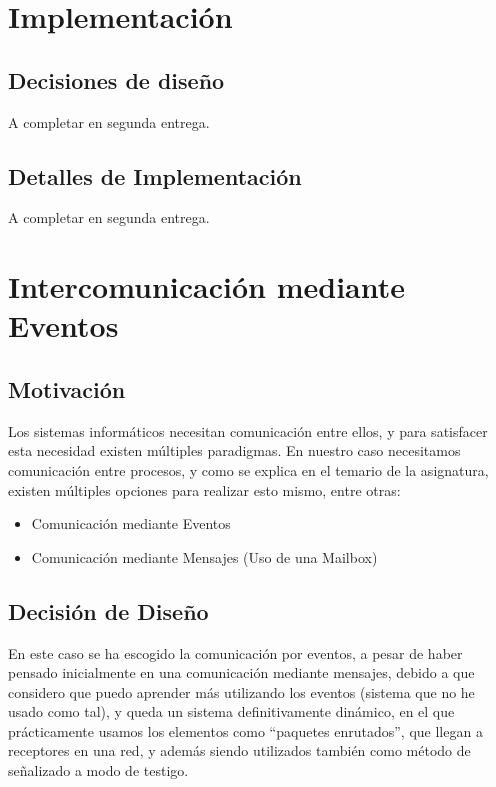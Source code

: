 \documentclass[a4paper,openright,12pt]{article}
\begin{document}
\section{Implementación}
\subsection{Decisiones de diseño}
A completar en segunda entrega.

\subsection{Detalles de Implementación}
A completar en segunda entrega.


\clearpage
\section{Intercomunicación mediante Eventos}
\subsection{Motivación}
Los sistemas informáticos necesitan comunicación entre ellos, y para satisfacer esta necesidad existen múltiples paradigmas.
En nuestro caso necesitamos comunicación entre procesos, y como se explica en el temario de la asignatura, existen múltiples
opciones para realizar esto mismo, entre otras:
\begin{itemize}
    \item Comunicación mediante Eventos
    \item Comunicación mediante Mensajes (Uso de una Mailbox)
\end{itemize}

\subsection{Decisión de Diseño}
En este caso se ha escogido la comunicación por eventos, a pesar de haber pensado inicialmente en una comunicación mediante mensajes, debido a que considero
que puedo aprender más utilizando los eventos (sistema que no he usado como tal), y queda un sistema definitivamente dinámico, en el que prácticamente usamos los elementos como
``paquetes enrutados'', que llegan a receptores en una red, y además siendo utilizados también como método de señalizado a modo de testigo.
\end{document}
